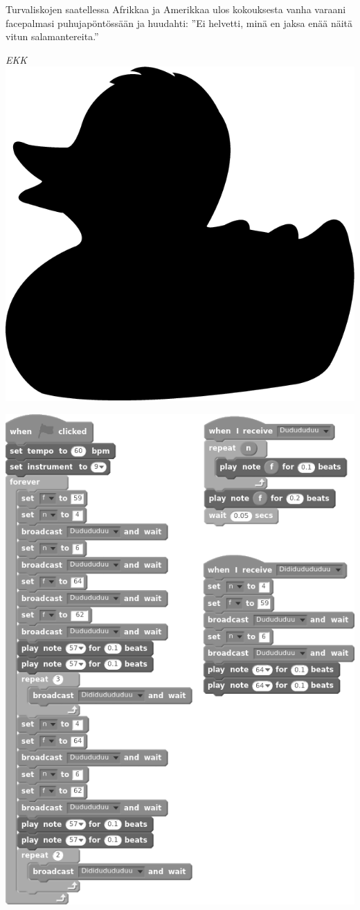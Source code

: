 {Turvaliskojen saatellessa Afrikkaa ja Amerikkaa ulos ko\-kouk\-ses\-ta vanha varaani facepalmasi puhujapöntössään ja huudahti: ''Ei helvetti, minä en jaksa enää näitä vitun sala\-man\-te\-rei\-ta.''\\
\vspace{3mm}

\emph{EKK}\\

\vspace*{\fill}
{
\hfill\includegraphics[scale=0.075]{graphics/rubber-duck.png}\hfill
}
\vspace*{\fill}
}
\newpage
\pagecolor{black!5}\afterpage{\nopagecolor}
\noindent
\includegraphics[scale=1.5]{graphics/scratch.png}
\clearpage
\headerfooteron{}
